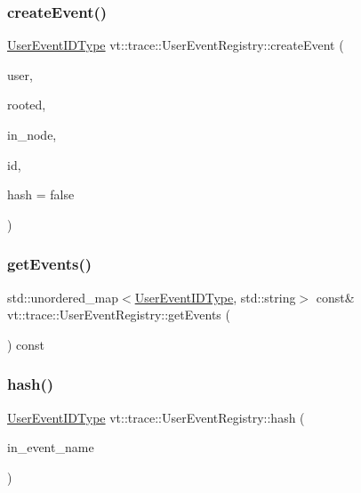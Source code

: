 \subsubsection{\texorpdfstring{create\+Event()}{createEvent()}}
{\footnotesize\ttfamily \hyperlink{namespacevt_1_1trace_a5908920d051c144c89f17c69ed262350}{User\+Event\+I\+D\+Type} vt\+::trace\+::\+User\+Event\+Registry\+::create\+Event (\begin{DoxyParamCaption}\item[{bool}]{user,  }\item[{bool}]{rooted,  }\item[{\hyperlink{namespacevt_a866da9d0efc19c0a1ce79e9e492f47e2}{Node\+Type}}]{in\+\_\+node,  }\item[{\hyperlink{namespacevt_1_1trace_a70c43e0e1596eea236912d4197d3120a}{User\+Spec\+Event\+I\+D\+Type}}]{id,  }\item[{bool}]{hash = {\ttfamily false} }\end{DoxyParamCaption})}

\mbox{\label{structvt_1_1trace_1_1_user_event_registry_aaa8cbfc8f3596bb5f9aa97cccd72f890}} 
\subsubsection{\texorpdfstring{get\+Events()}{getEvents()}}
{\footnotesize\ttfamily std\+::unordered\+\_\+map$<$\hyperlink{namespacevt_1_1trace_a5908920d051c144c89f17c69ed262350}{User\+Event\+I\+D\+Type}, std\+::string$>$ const\& vt\+::trace\+::\+User\+Event\+Registry\+::get\+Events (\begin{DoxyParamCaption}{ }\end{DoxyParamCaption}) const\hspace{0.3cm}{\ttfamily [inline]}}

\mbox{\label{structvt_1_1trace_1_1_user_event_registry_a99ef8a7f7df7a11fac6ada816f83cfbf}} 
\subsubsection{\texorpdfstring{hash()}{hash()}}
{\footnotesize\ttfamily \hyperlink{namespacevt_1_1trace_a5908920d051c144c89f17c69ed262350}{User\+Event\+I\+D\+Type} vt\+::trace\+::\+User\+Event\+Registry\+::hash (\begin{DoxyParamCaption}\item[{std\+::string const \&}]{in\+\_\+event\+\_\+name }\end{DoxyParamCaption})}

